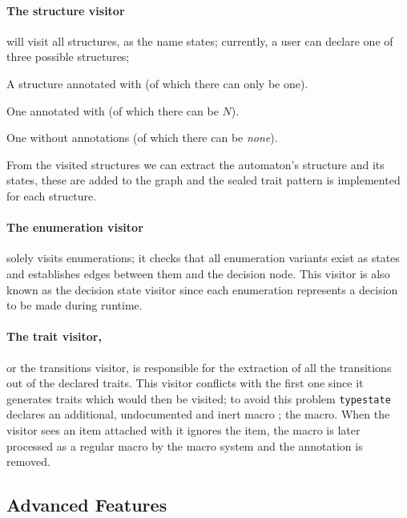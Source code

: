 \paragraph{The structure visitor} will visit all structures, as the name states;
currently, a user can declare one of three possible structures;
\begin{compactitem}
    \item A structure annotated with \textcolor{attrgreen}{} (of which there can only be one).
    \item One annotated with \textcolor{attrgreen}{} (of which there can be $N$).
    \item One without annotations (of which there can be \emph{none}).
\end{compactitem}
From the visited structures we can extract the automaton's structure and its states,
these are added to the graph and the sealed trait pattern is implemented for each structure.

\paragraph{The enumeration visitor} solely visits enumerations;
it checks that all enumeration variants exist as states and establishes edges between them and the decision node.
This visitor is also known as the decision state visitor since each enumeration represents a decision to be made during runtime.

\paragraph{The trait visitor,} or the transitions visitor,
is responsible for the extraction of all the transitions out of the declared traits.
This visitor conflicts with the first one since it generates traits which would then be visited;
to avoid this problem \texttt{typestate} declares an additional, undocumented and inert macro ;
the \textcolor{attrgreen}{} macro.
When the visitor sees an item attached with \textcolor{attrgreen}{} it ignores the item,
the \textcolor{attrgreen}{} macro is later processed as a regular macro by the macro system and the annotation is removed.


\subsection{Advanced Features}\label{sec:macro-dsl:advanced}

